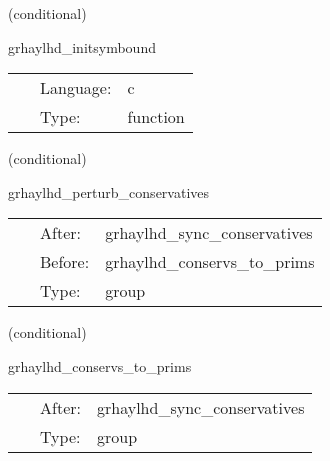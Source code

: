 \vspace{5mm}

   (conditional) 

\hspace{5mm} grhaylhd\_initsymbound 

\hspace{5mm}{\it schedule symmetries } 


\hspace{5mm}

 \begin{tabular*}{160mm}{cll} 
~ & Language:  & c \\ 
~ & Type:  & function \\ 
\end{tabular*} 


\vspace{5mm}

   (conditional) 

\hspace{5mm} grhaylhd\_perturb\_conservatives 

\hspace{5mm}{\it perturb conservatives before con2prim } 


\hspace{5mm}

 \begin{tabular*}{160mm}{cll} 
~ & After:  & grhaylhd\_sync\_conservatives \\ 
~ & Before:  & grhaylhd\_conservs\_to\_prims \\ 
~ & Type:  & group \\ 
\end{tabular*} 


\vspace{5mm}

   (conditional) 

\hspace{5mm} grhaylhd\_conservs\_to\_prims 

\hspace{5mm}{\it compute primitive variables from conservatives } 


\hspace{5mm}

 \begin{tabular*}{160mm}{cll} 
~ & After:  & grhaylhd\_sync\_conservatives \\ 
~ & Type:  & group \\ 
\end{tabular*} 


